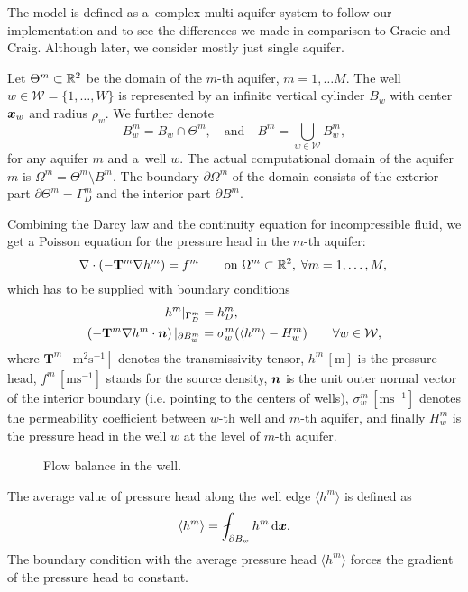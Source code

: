 \documentclass[FM,Dis]{tulthesis}
\newcommand{\figpath}{figures/}
\begin{document}
The model is defined as a~complex multi-aquifer system to follow our implementation and to see the differences
we made in comparison to Gracie and Craig. Although later, we consider mostly just single aquifer.

Let $\Theta^m\subset {\mathbb{R}}^2$ be the domain of the $m$-th aquifer, $m=1,\ldots M$.
The well $w\in\mathcal{W}=\{1,\ldots,W\}$ is represented by an infinite vertical cylinder $B_w$
with center $\mathbf{\boldsymbol{x}}_w$ and radius $\rho_w$.  We further denote 
\[
 B^m_w = B_w \cap \Theta^m, \quad \text{and} \quad
 B^m=\bigcup_{w\in \mathcal{W}}B^m_w,
\]
for any aquifer $m$ and a~well $w$.
The actual computational domain of the aquifer $m$ is $\Omega^m = \Theta^m\setminus B^m$. The boundary $\partial\Omega^m$ of 
the domain consists of the exterior part $\partial\Theta^m=\Gamma^m_D$ and the interior part $\partial B^m$.


Combining the Darcy law and the continuity equation for incompressible fluid, we get
a Poisson equation for the pressure head in the $m$-th aquifer:
\begin{equation} \label{eqn:poisson}
\nabla\cdot(-\mathbf{T}^m\nabla h^m) = f^m \qquad \textrm{on } \Omega^m\subset{\mathbb{R}}^2,\; \forall m=1,\dots,M, \\
\end{equation}
which has to be supplied with boundary conditions
\begin{align}
h^m|_{\Gamma^m_D} &= h^m_D, \\
\label{eq:interior_bc}
\left(-\mathbf{T}^m\nabla h^m\cdot\mathbf{\boldsymbol{n}}\right)|_{\partial B^m_w} &= \sigma^m_w(\langle h^m \rangle - H^m_w) \qquad \forall w\in\mathcal{W},
\end{align}
%
where $\mathbf{T}^m\, [\textrm{m}^2\textrm{s}^{-1}]$ denotes the transmissivity tensor,
$h^m\, [\textrm{m}]$ is the pressure head, $f^m\, [\textrm{m}\textrm{s}^{-1}]$ stands for the source density,
$\mathbf{\boldsymbol{n}}$ is the unit outer normal vector of the interior boundary (i.e. pointing to the centers of wells),
$\sigma^m_w\, [\textrm{m}\textrm{s}^{-1}]$ denotes the permeability coefficient between $w$-th well and 
$m$-th aquifer, and finally $H_w^m$ is the pressure head in the well $w$ at the level of $m$-th aquifer.
%
\begin{figure}[!htb]
  \begin{center}         
    \def\svgwidth{0.5\textwidth}
    
  \end{center}
  \caption{Flow balance in the well.}
  \label{fig:well_flows}
\end{figure}
%
The average value of pressure head along the well edge $\langle{h^m}\rangle$ is defined as
\[\langle{h^m}\rangle = \fint_{\partial B_w} h^m  \dd\bx.\]
The boundary condition with the average pressure head $\langle{h^m}\rangle$ forces the gradient
of the pressure head to constant.
\end{document}
